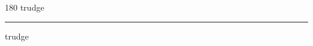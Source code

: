 
\begin{frame}
\begin{center}
\begin{turn}{180}
{\fontsize{2.5cm}{1em}\selectfont trudge}
\end{turn}
\vspace{1em}\par  
\hrule
\vspace{1em}\par  
{\fontsize{2.5cm}{1em}\selectfont trudge}
\end{center}
\end{frame}
